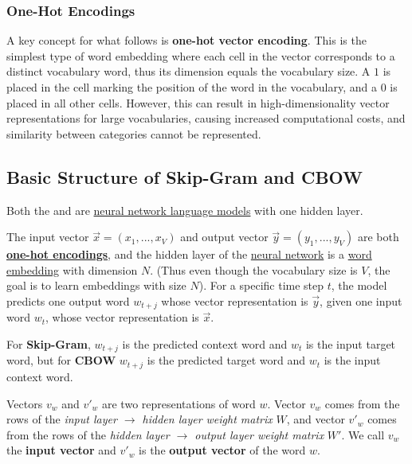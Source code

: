 \subsubsection{One-Hot Encodings} \label{sec:OneHotEncodings}

A key concept for what follows is \textbf{one-hot vector encoding}. This is the simplest type of word embedding where each cell in the vector corresponds to a distinct vocabulary word, thus its dimension equals the vocabulary size. A $1$ is placed in the cell marking the position of the word in the vocabulary, and a $0$ is placed in all other cells. However, this can result in high-dimensionality vector representations for large vocabularies, causing increased computational costs, and similarity between categories cannot be represented. 

\subsection{Basic Structure of Skip-Gram and CBOW} \label{sec:BasicSkipGramAndCBOW}

Both the  and  are \hyperref[sec:NeuralLM]{neural network language models} with one hidden layer.  

The input vector $\overrightarrow{x} = (x_1,..., x_V)$ and output vector $\overrightarrow{y} = (y_1,...,y_V)$ are both \textbf{\hyperref[sec:OneHotEncodings]{one-hot encodings}}, and the hidden layer of the \hyperref[sec:NeuralLM]{neural network} is a \hyperref[sec:WordEmbeddings]{word embedding} with dimension $N$. (Thus even though the vocabulary size is $V$, the goal is to learn embeddings with size $N$). For a specific time step $t$, the model predicts one output word $w_{t+j}$ whose vector representation is $\overrightarrow{y}$, given one input word $w_t$, whose vector representation is $\overrightarrow{x}$.   

For \textbf{Skip-Gram}, $w_{t+j}$ is the predicted context word and $w_t$ is the input target word, but for \textbf{CBOW} $w_{t+j}$ is the predicted target word and $w_t$ is the input context word.   

Vectors $v_w$ and $v'_w$ are two representations of word $w$. Vector $v_w$ comes from the rows of the \textit{input layer $\rightarrow$ hidden layer weight matrix} $W$, and vector $v'_w$ comes from the rows of the \textit{hidden layer $\rightarrow$ output layer weight matrix} $W'$. We call $v_w$ the \textbf{input vector} and $v'_w$ is the \textbf{output vector} of the word $w$. 


